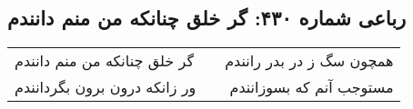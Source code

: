 \begin{center}
\section*{رباعی شماره ۴۳۰: گر خلق چنانکه من منم دانندم}
\label{sec:sh430}
\begin{longtable}{l p{0.5cm} r}
گر خلق چنانکه من منم دانندم
&&
همچون سگ ز در بدر رانندم
\\
ور زانکه درون برون بگردانندم
&&
مستوجب آنم که بسوزانندم
\\
\end{longtable}
\end{center}
